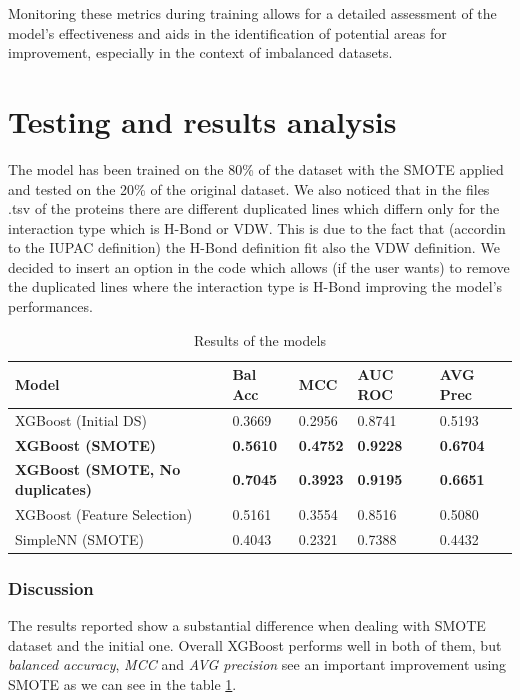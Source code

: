 \documentclass[10pt,twocolumn,letterpaper]{article}
\begin{document}
Monitoring these metrics during training allows for a detailed assessment of the model's effectiveness and aids in the identification of potential areas for improvement, especially in the context of imbalanced datasets.

\section{Testing and results analysis}
The model has been trained on the 80\% of the dataset with the SMOTE applied and tested on the 20\% of the original dataset.
We also noticed that in the files .tsv of the proteins there are different duplicated lines which differn only for
the interaction type which is H-Bond or VDW. This is due to the fact that (accordin to the IUPAC definition) the H-Bond definition 
fit also the VDW definition. We decided to insert an option in the code which allows (if the user wants) 
to remove the duplicated lines where the interaction type is H-Bond improving the model's performances.
\begin{table}[h!]
    \centering
    \begin{tabular}{|p{1.6cm}|p{1.2cm}|p{1.2cm}|p{1.2cm}|p{1.2cm}|}
    \hline
    \textbf{Model} & \textbf{Bal Acc} & \textbf{MCC} & \textbf{AUC ROC} & \textbf{AVG Prec} \\
    \hline
    XGBoost (Initial DS) & 0.3669 & 0.2956 & 0.8741 & 0.5193 \\
    \hline
    \textbf{XGBoost (SMOTE)} & \textbf{0.5610} & \textbf{0.4752} & \textbf{0.9228} & \textbf{0.6704} \\
    \hline
    \textbf{XGBoost (SMOTE, No duplicates)} & \textbf{0.7045} & \textbf{0.3923} & \textbf{0.9195} & \textbf{0.6651} \\
    \hline
    XGBoost (Feature Selection) & 0.5161 & 0.3554 & 0.8516 & 0.5080 \\
    \hline
    SimpleNN (SMOTE) & 0.4043 & 0.2321 & 0.7388 & 0.4432 \\ %
    \hline
    \end{tabular}
    \caption{Results of the models}
    \label{tab:results}
\end{table}

\subsubsection{Discussion}
The results reported show a substantial difference when dealing with SMOTE dataset and the initial one. Overall XGBoost 
performs well in both of them, but \textit{balanced accuracy}, \textit{MCC} and \textit{AVG precision} see an important 
improvement using SMOTE as we can see in the table \ref{tab:results}. 
\end{document}
